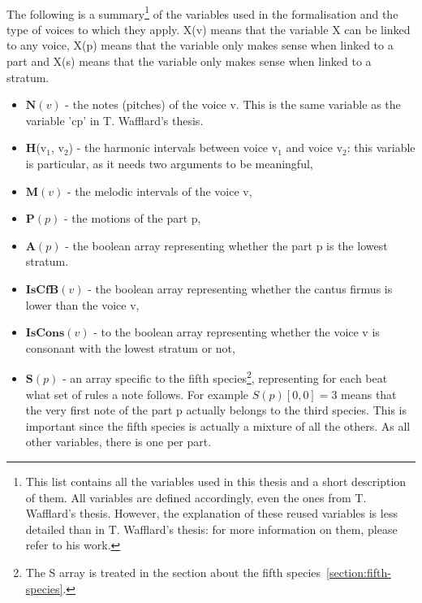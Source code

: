 \paragraph{}
The following is a summary\footnote{This list contains all the variables used in this thesis and a short description of them. All variables are defined accordingly, even the ones from T. Wafflard's thesis. However, the explanation of these reused variables is less detailed than in T. Wafflard's thesis: for more information on them, please refer to his work.} of the variables used in the formalisation and the type of voices to which they apply. X(v) means that the variable X can be linked to any voice, X(p) means that the variable only makes sense when linked to a part and X(s) means that the variable only makes sense when linked to a stratum.
\begin{itemize}
    \item $\textbf{N}(v)$ - the notes (pitches) of the voice v. This is the same variable as the variable 'cp' in T. Wafflard's thesis.
    \item \textbf{H}(v$_1$, v$_2$) - the harmonic intervals between voice v$_1$ and voice v$_2$: this variable is particular, as it needs two arguments to be meaningful,
    \item $\textbf{M}(v)$ - the melodic intervals of the voice v, 
    \item $\textbf{P}(p)$ - the motions of the part p,
    \item $\textbf{A}(p)$ - the boolean array representing whether the part p is the lowest stratum.
    \item $\textbf{IsCfB}(v)$ - the boolean array representing whether the cantus firmus is lower than the voice v,
    \item $\textbf{IsCons}(v)$ - to the boolean array representing whether the voice v is consonant with the lowest stratum or not,
    \item $\textbf{S}(p)$ - an array specific to the fifth species\footnote{The S array is treated in the section about the fifth species~\ref{section:fifth-species}.}, representing for each beat what set of rules a note follows. For example $S(p)[0, 0]=3$ means that the very first note of the part p actually belongs to the third species. This is important since the fifth species is actually a mixture of all the others. As all other variables, there is one per part.
\end{itemize}

